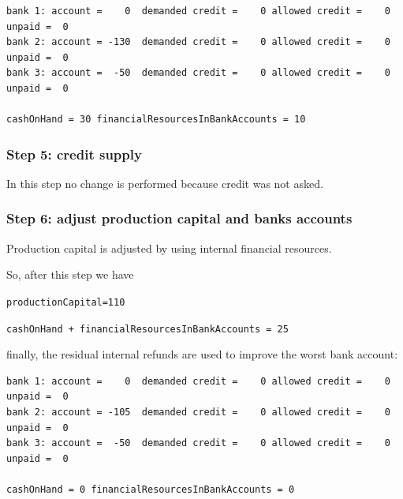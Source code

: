 \documentclass{article}
\begin{document}
\begin{verbatim}
bank 1: account =    0  demanded credit =    0 allowed credit =    0 unpaid =  0
bank 2: account = -130  demanded credit =    0 allowed credit =    0 unpaid =  0
bank 3: account =  -50  demanded credit =    0 allowed credit =    0 unpaid =  0

cashOnHand = 30 financialResourcesInBankAccounts = 10
\end{verbatim}

	\subsubsection*{Step 5: credit supply}
In this step no change is performed because credit was not asked.

	\subsubsection*{Step 6: adjust production capital and banks accounts}

	Production capital is adjusted by using internal financial resources. 

	So, after this step we have

	\verb+productionCapital=110+

	\verb/cashOnHand + financialResourcesInBankAccounts = 25/

	finally, the residual internal refunds are used to improve the worst bank account:

\begin{verbatim}
bank 1: account =    0  demanded credit =    0 allowed credit =    0 unpaid =  0
bank 2: account = -105  demanded credit =    0 allowed credit =    0 unpaid =  0
bank 3: account =  -50  demanded credit =    0 allowed credit =    0 unpaid =  0

cashOnHand = 0 financialResourcesInBankAccounts = 0
\end{verbatim}
\end{document}
